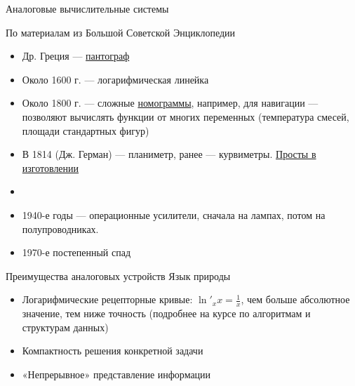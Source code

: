 \documentclass[xetex,aspectratio=43]{beamer}
\begin{document}
\begin{frame}{Аналоговые вычислительные системы}

	\pause

	По материалам из Большой Советской Энциклопедии

	\begin{itemize}

		\item
		Др. Греция ---
		\href{https://ru.wikipedia.org/wiki/\%D0\%9F\%D0\%B0\%D0\%BD\%D1\%82\%D0\%BE\%D0\%B3\%D1\%80\%D0\%B0\%D1\%84_(\%D0\%BF\%D1\%80\%D0\%B8\%D0\%B1\%D0\%BE\%D1\%80)\#\%D0\%98\%D0\%B7\%D0\%BE\%D0\%B1\%D1\%80\%D0\%B0\%D0\%B6\%D0\%B5\%D0\%BD\%D0\%B8\%D1\%8F}{пантограф}
		\item
		Около 1600 г. --- логарифмическая линейка
		\item
		Около 1800 г. --- сложные
		\href{https://en.wikipedia.org/wiki/Nomogram}{номограммы}, например,
		для навигации --- позволяют вычислять функции от многих переменных
		(температура смесей, площади стандартных фигур)
		\item
		В 1814 (Дж. Герман) --- планиметр, ранее --- курвиметры.
		\href{https://youtu.be/kwSN7edZZnM}{Просты в изготовлении}
		\item
		\item
		1940-е годы --- операционные усилители, сначала на лампах, потом на
		полупроводниках.
		\item
		1970-е постепенный спад
	\end{itemize}
\end{frame}

\begin{frame}{Преимущества аналоговых устройств}
	Язык природы

	\begin{itemize}

		\item
		Логарифмические рецепторные кривые: \(\ln'_{x}x = \frac{1}{x}\), чем
		больше абсолютное значение, тем ниже точность (подробнее на курсе по
		алгоритмам и структурам данных)
		\item
		Компактность решения конкретной задачи
		\item
		«Непрерывное» представление информации
	\end{itemize}

\end{frame}
\end{document}
